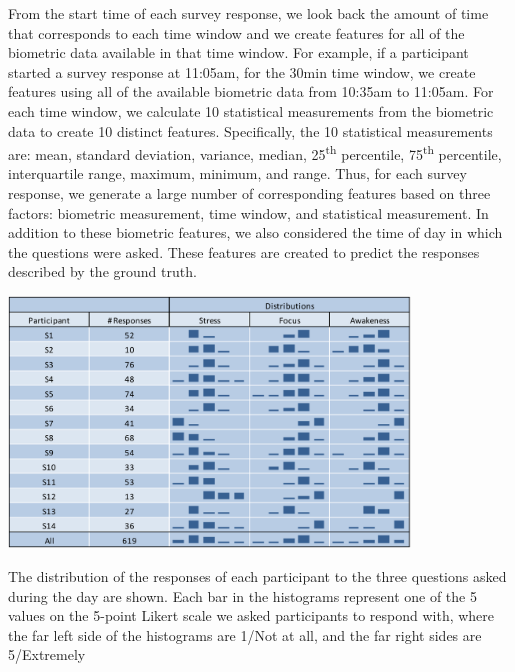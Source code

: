 From the start time of each survey response, we look back the amount of time 
that corresponds to each time window and we create features for all of the 
biometric data available in that time window. For example, if a participant 
started a survey response at 11:05am, for the 30min time window, we create 
features using all of the available biometric data from 10:35am to 11:05am. 
For each time window, we calculate 10 statistical measurements from the 
biometric data to create 10 distinct features. Specifically, the 10 
statistical measurements are: mean, standard deviation, variance, median, 
25\textsuperscript{th} percentile, 75\textsuperscript{th} percentile, interquartile range, maximum, minimum, and 
range. Thus, for each survey response, we generate a large number of 
corresponding features based on three factors: biometric measurement, time 
window, and statistical measurement. In addition to these biometric 
features, we also considered the time of day in which the questions were 
asked. These features are created to predict the responses described by the 
ground truth. 

\begin{table}
  \centering
      \includegraphics[width=0.8\textwidth]{distributiontable.pdf}
  \caption{The distribution of the responses of each participant to the three questions asked during the day are shown. Each bar in the histograms represent one of the 5 values on the 5-point Likert scale we asked participants to respond with, where the far left side of the histograms are 1/Not at all, and the far right sides are 5/Extremely}
   \label{responseDistribution}
\end{table}

